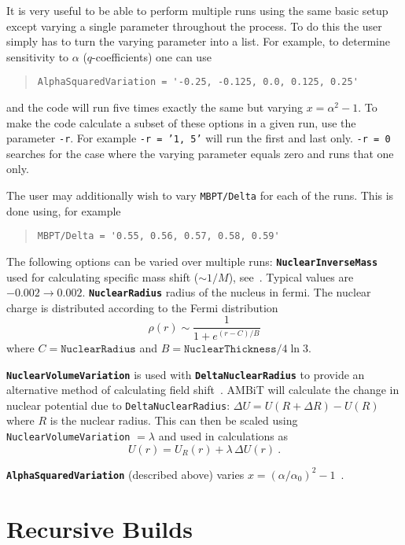 \documentclass[a4paper,11pt]{article}
\newcommand{\option}[1]{\smallskip\noindent\textbf{\texttt{#1}}}
\begin{document}
{It is very useful to be able to perform multiple runs using the same basic setup except varying a single parameter throughout the process. To do this the user simply has to turn the varying parameter into a list. For example, to determine sensitivity to $\alpha$ ($q$-coefficients) one can use
\begin{quote}
\begin{verbatim}
AlphaSquaredVariation = '-0.25, -0.125, 0.0, 0.125, 0.25'
\end{verbatim}
\end{quote}
and the code will run five times exactly the same but varying $x = \alpha^2 - 1$. To make the code calculate a subset of these options in a given run, use the parameter \texttt{-r}. For example \texttt{-r = '1, 5'} will run the first and last only. \texttt{-r = 0} searches for the case where the varying parameter equals zero and runs that one only.

The user may additionally wish to vary \texttt{MBPT/Delta} for each of the runs. This is done using, for example
\begin{quote}
\begin{verbatim}
MBPT/Delta = '0.55, 0.56, 0.57, 0.58, 0.59'
\end{verbatim}
\end{quote}

The following options can be varied over multiple runs:
\option{NuclearInverseMass} used for calculating specific mass shift ($\sim 1/M$), see~\cite{berengut03pra,berengut05pra,berengut06pra}. Typical values are $-0.002 \rightarrow 0.002$.
\option{NuclearRadius} radius of the nucleus in fermi. The nuclear charge is distributed according to the Fermi distribution
\[
\rho(r) \sim \frac{1}{1 + e^{(r - C)/B}}
\]
where $C = \texttt{NuclearRadius}$ and $B = \texttt{NuclearThickness}/4\ln 3$.

\option{NuclearVolumeVariation} is used with \texttt{\textbf{DeltaNuclearRadius}} to provide an alternative method of calculating field shift~\cite{berengut03pra}. AMBiT will calculate the change in nuclear potential due to \texttt{DeltaNuclearRadius}: $\Delta U = U(R+\Delta R) - U(R)$ where $R$ is the nuclear radius. This can then be scaled using \texttt{NuclearVolumeVariation} $=\lambda$ and used in calculations as
\[
	U(r) = U_R(r) + \lambda\, \Delta U(r)\ .
\]

\option{AlphaSquaredVariation} (described above) varies $x = (\alpha/\alpha_0)^2-1$~\cite{dzuba99pra}.

\section{Recursive Builds}

}
\end{document}
